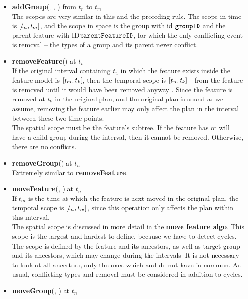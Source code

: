 \begin{itemize}
  \item \textbf{addGroup}(, , ) from $t_n$ to $t_m$\\
    The scopes are very similar in this and the preceding rule. The scope in time is $\interval{t_n}{t_m}$, and the scope in space is the group with id $\texttt{groupID}$ and the parent feature with ID$\texttt{parentFeatureID}$, for which the only conflicting event is removal -- the types of a group and its parent never conflict.
  \item \textbf{removeFeature}() at $t_n$\\
    If the original interval containing $t_n$ in which the feature exists inside the feature model is $\interval{t_m}{t_k}$, then the temporal scope is $\interval{t_n}{t_k}$ - from the feature is removed until it would have been removed anyway . Since the feature is removed at $t_k$ in the original plan, and the original plan is sound as we assume, removing the feature earlier may only affect the plan in the interval between these two time points.\\
    The spatial scope must be the feature's subtree. If the feature has or will have a child group during the interval, then it cannot be removed. Otherwise, there are no conflicts.
  \item \textbf{removeGroup}() at $t_n$\\
    Extremely similar to \textbf{removeFeature}. 
  \item \textbf{moveFeature}(, ) at $t_n$\\
  If $t_m$ is the time at which the feature is next moved in the original plan, the temporal scope is $\interval{t_n}{t_m}$, since this operation only affects the plan within this interval.\\
  The spatial scope is discussed in more detail in the \textbf{move feature algo}. This scope is the largest and hardest to define, because we have to detect cycles. The scope is defined by the feature and its ancestors, as well as target group and its ancestors, which may change during the intervals. It is not necessary to look at all ancestors, only the ones which  and  do not have in common. As usual, conflicting types and removal must be considered in addition to cycles.
  \item \textbf{moveGroup}(, ) at $t_n$\\

\end{itemize}
